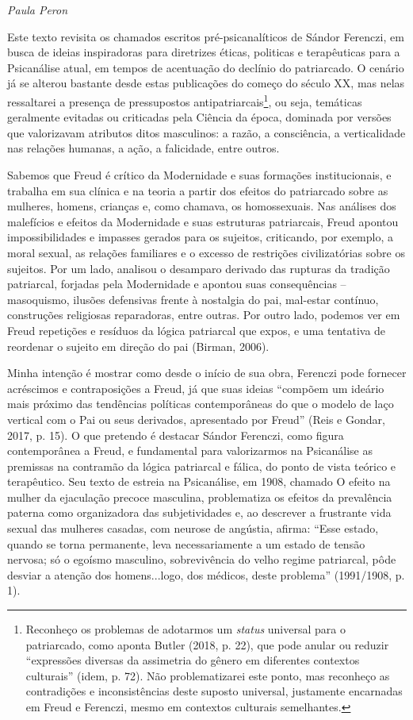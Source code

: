 \begin{flushright}
\emph{Paula Peron}
\end{flushright}

Este texto revisita os chamados escritos pré-psicanalíticos de Sándor
Ferenczi, em busca de ideias inspiradoras para diretrizes éticas,
politicas e terapêuticas para a Psicanálise atual, em tempos de
acentuação do declínio do patriarcado. O cenário já se alterou bastante
desde estas publicações do começo do século XX, mas nelas ressaltarei a
presença de pressupostos antipatriarcais\footnote{Reconheço os problemas
  de adotarmos um \emph{status} universal para o patriarcado, como
  aponta Butler (2018, p. 22), que pode anular ou reduzir ``expressões
  diversas da assimetria do gênero em diferentes contextos culturais''
  (idem, p. 72). Não problematizarei este ponto, mas reconheço as
  contradições e inconsistências deste suposto universal, justamente
  encarnadas em Freud e Ferenczi, mesmo em contextos culturais
  semelhantes.}, ou seja, temáticas geralmente evitadas ou criticadas
pela Ciência da época, dominada por versões que valorizavam atributos
ditos masculinos: a razão, a consciência, a verticalidade nas relações
humanas, a ação, a falicidade, entre outros.

Sabemos que Freud é crítico da Modernidade e suas formações
institucionais, e trabalha em sua clínica e na teoria a partir dos
efeitos do patriarcado sobre as mulheres, homens, crianças e, como
chamava, os homossexuais. Nas análises dos malefícios e efeitos da
Modernidade e suas estruturas patriarcais, Freud apontou
impossibilidades e impasses gerados para os sujeitos, criticando, por
exemplo, a moral sexual, as relações familiares e o excesso de
restrições civilizatórias sobre os sujeitos. Por um lado, analisou o
desamparo derivado das rupturas da tradição patriarcal, forjadas pela
Modernidade e apontou suas consequências -- masoquismo, ilusões
defensivas frente à nostalgia do pai, mal-estar contínuo, construções
religiosas reparadoras, entre outras. Por outro lado, podemos ver em
Freud repetições e resíduos da lógica patriarcal que expos, e uma
tentativa de reordenar o sujeito em direção do pai (Birman, 2006).

Minha intenção é mostrar como desde o início de sua obra, Ferenczi pode
fornecer acréscimos e contraposições a Freud, já que suas ideias
``compõem um ideário mais próximo das tendências políticas
contemporâneas do que o modelo de laço vertical com o Pai ou seus
derivados, apresentado por Freud'' (Reis e Gondar, 2017, p. 15). O que
pretendo é destacar Sándor Ferenczi, como figura contemporânea a Freud,
e fundamental para valorizarmos na Psicanálise as premissas na contramão
da lógica patriarcal e fálica, do ponto de vista teórico e terapêutico.
Seu texto de estreia na Psicanálise, em 1908, chamado O efeito na mulher
da ejaculação precoce masculina, problematiza os efeitos da prevalência
paterna como organizadora das subjetividades e, ao descrever a
frustrante vida sexual das mulheres casadas, com neurose de angústia,
afirma: ``Esse estado, quando se torna permanente, leva necessariamente
a um estado de tensão nervosa; só o egoísmo masculino, sobrevivência do
velho regime patriarcal, pôde desviar a atenção dos homens...logo, dos
médicos, deste problema'' (1991/1908, p. 1).

